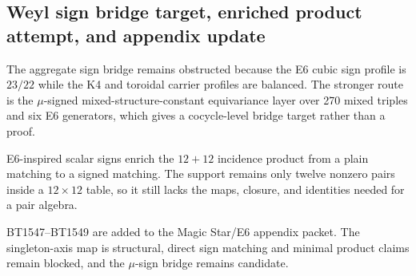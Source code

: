 \subsection{Weyl sign bridge target, enriched product attempt, and appendix update}
\label{sec:bt1550-bt1552-weyl-enriched-appendix}

The aggregate sign bridge remains obstructed because the E6 cubic sign profile is $23/22$ while the K4 and toroidal carrier profiles are balanced.  The stronger route is the $\mu$-signed mixed-structure-constant equivariance layer over 270 mixed triples and six E6 generators, which gives a cocycle-level bridge target rather than a proof.

E6-inspired scalar signs enrich the $12+12$ incidence product from a plain matching to a signed matching.  The support remains only twelve nonzero pairs inside a $12\times12$ table, so it still lacks the maps, closure, and identities needed for a pair algebra.

BT1547--BT1549 are added to the Magic Star/E6 appendix packet.  The singleton-axis map is structural, direct sign matching and minimal product claims remain blocked, and the $\mu$-sign bridge remains candidate.
